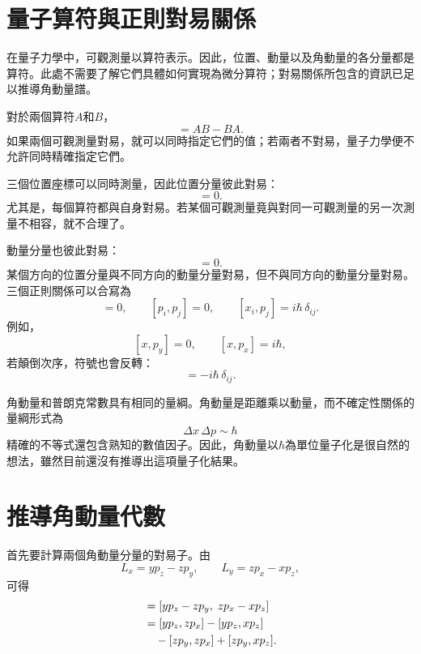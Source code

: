 \section{量子算符與正則對易關係}

在量子力學中，可觀測量以算符表示。因此，位置、動量以及角動量的各分量都是算符。此處不需要了解它們具體如何實現為微分算符；對易關係所包含的資訊已足以推導角動量譜。

對於兩個算符\(A\)和\(B\)，
\begin{equation}
[A,B]=AB-BA.
\end{equation}
如果兩個可觀測量對易，就可以同時指定它們的值；若兩者不對易，量子力學便不允許同時精確指定它們。

三個位置座標可以同時測量，因此位置分量彼此對易：
\begin{equation}
[x_i,x_j]=0.
\end{equation}
尤其是，每個算符都與自身對易。若某個可觀測量竟與對同一可觀測量的另一次測量不相容，就不合理了。

動量分量也彼此對易：
\begin{equation}
[p_i,p_j]=0.
\end{equation}
某個方向的位置分量與不同方向的動量分量對易，但不與同方向的動量分量對易。三個正則關係可以合寫為
\begin{equation}
[x_i,x_j]=0,\qquad
[p_i,p_j]=0,\qquad
[x_i,p_j]=i\hbar\,\delta_{ij}.
\end{equation}
例如，
\[
[x,p_y]=0,\qquad [x,p_x]=i\hbar,
\]
若顛倒次序，符號也會反轉：
\begin{equation}
[p_j,x_i]=-i\hbar\,\delta_{ij}.
\end{equation}

角動量和普朗克常數具有相同的量綱。角動量是距離乘以動量，而不確定性關係的量綱形式為
\begin{equation}
\Delta x\,\Delta p\sim\hbar
\end{equation}
精確的不等式還包含熟知的數值因子。因此，角動量以\(\hbar\)為單位量子化是很自然的想法，雖然目前還沒有推導出這項量子化結果。

\section{推導角動量代數}

首先要計算兩個角動量分量的對易子。由
\[
L_x=yp_z-zp_y,\qquad
L_y=zp_x-xp_z,
\]
可得
\begin{align}
[L_x,L_y]
&=[yp_z-zp_y,\;zp_x-xp_z] \\
&=[yp_z,zp_x]-[yp_z,xp_z] \notag\\
&\quad{}-[zp_y,zp_x]+[zp_y,xp_z].
\end{align}

